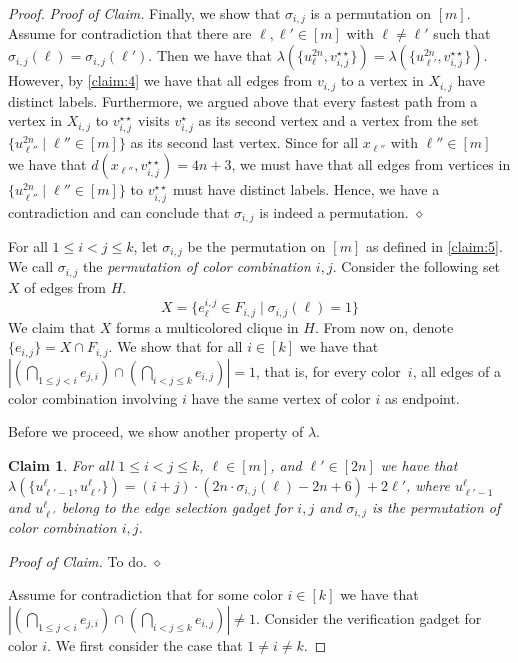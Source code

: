 \documentclass[11pt,a4paper]{article}
\newtheorem{claim}[theorem]{Claim}
\theoremstyle{remark}
\theoremstyle{definition}
\newenvironment{claimproof}{\noindent\emph{Proof of Claim.}}{\hfill$\diamond$

}
\begin{document}
\begin{proof}
\begin{claimproof}
    Finally, we show that $\sigma_{i,j}$ is a permutation on $[m]$. Assume for contradiction that there are $\ell,\ell'\in[m]$ with $\ell\neq \ell'$ such that $\sigma_{i,j}(\ell)=\sigma_{i,j}(\ell')$. Then we have that $\lambda(\{u_{\ell}^{2n},v_{i,j}^{\star\star}\})=\lambda(\{u_{\ell'}^{2n},v_{i,j}^{\star\star}\})$. However, by \cref{claim:4} we have that all edges from $v_{i,j}$ to a vertex in $X_{i,j}$ have distinct labels. Furthermore, we argued above that every fastest path from a vertex in $X_{i,j}$ to $v_{i,j}^{\star\star}$ visits $v_{i,j}^\star$ as its second vertex and a vertex from the set $\{u_{\ell''}^{2n}\mid \ell''\in[m]\}$ as its second last vertex. Since for all $x_{\ell''}$ with $\ell''\in[m]$ we have that $d(x_{\ell''},v_{i,j}^{\star\star})=4n+3$, we must have that all edges from vertices in $\{u_{\ell''}^{2n}\mid \ell''\in[m]\}$ to $v_{i,j}^{\star\star}$ must have distinct labels. Hence, we have a contradiction and can conclude that $\sigma_{i,j}$ is indeed a permutation.
\end{claimproof}

For all $1\le i<j\le k$, let $\sigma_{i,j}$ be the permutation on $[m]$ as defined in \cref{claim:5}. We call $\sigma_{i,j}$ the \emph{permutation of color combination $i,j$}. Consider the following set $X$ of edges from $H$.
\[
X=\{e_\ell^{i,j}\in F_{i,j}\mid \sigma_{i,j}(\ell)=1\}
\]
We claim that $X$ forms a multicolored clique in $H$.
From now on, denote $\{e_{i,j}\}=X\cap F_{i,j}$. We show that for all $i\in [k]$ we have that $|(\bigcap_{1\le j<i} e_{j,i}) \cap (\bigcap_{i<j\le k} e_{i,j})|=1$, that is, for every color~$i$, all edges of a color combination involving $i$ have the same vertex of color $i$ as endpoint.

Before we proceed, we show another property of $\lambda$.

\begin{claim}\label{claim:6}
    For all $1\le i<j\le k$,  $\ell\in[m]$, and $\ell'\in[2n]$ we have that $\lambda(\{u^\ell_{\ell'-1},u^\ell_{\ell'}\})=(i+j)\cdot (2n\cdot \sigma_{i,j}(\ell) -2n+6)+2\ell'$, where $u^\ell_{\ell'-1}$ and $u^\ell_{\ell'}$ belong to the edge selection gadget for $i,j$ and $\sigma_{i,j}$ is the permutation of color combination $i,j$.
\end{claim}
\begin{claimproof}
    To do.
\end{claimproof}

Assume for contradiction that for some color $i\in[k]$ we have that $|(\bigcap_{1\le j<i} e_{j,i}) \cap (\bigcap_{i<j\le k} e_{i,j})|\neq 1$. 
Consider the verification gadget for color $i$. We first consider the case that $1\neq i\neq k$.

\end{proof}
\end{document}
